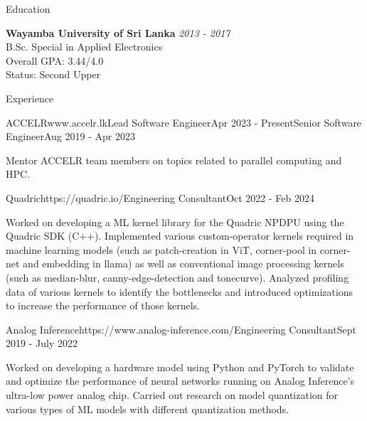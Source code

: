 \documentclass[
	11pt, %
]{./assets/resume} %
\begin{document}
\begin{rSection}{Education}

	\textbf{Wayamba University of Sri Lanka} \hfill \textit{2013 - 2017} \\ 
	B.Sc. Special in Applied Electronics \\
	Overall GPA: 3.44/4.0 \\
	Status: Second Upper
	
\end{rSection}


\begin{rSection}{Experience}

	\begin{rSubsectionM}{ACCELR}{www.accelr.lk}{Lead Software Engineer}{Apr 2023 - Present}{Senior Software Engineer}{Aug 2019 - Apr 2023}{}{}
        \item Mentor ACCELR team members on topics related to parallel computing and HPC.
	\end{rSubsectionM}

	\begin{rSubsectionX}{Quadric}{https://quadric.io/}{Engineering Consultant}{Oct 2022 - Feb 2024}
		\item Worked on developing a ML kernel library for the Quadric NPDPU using the Quadric SDK (C++). Implemented various custom-operator kernels required in machine learning models (such as patch-creation in ViT, corner-pool in corner-net and embedding in llama) as well as conventional image processing kernels (such as median-blur, canny-edge-detection and tonecurve). Analyzed profiling data of various kernels to identify the bottlenecks and introduced optimizations to increase the performance of those kernels.
	\end{rSubsectionX}

	\begin{rSubsectionX}{Analog Inference}{https://www.analog-inference.com/}{Engineering Consultant}{Sept 2019 - July 2022}
		\item Worked on developing a hardware model using Python and PyTorch to validate and optimize the performance of neural networks running on Analog Inference’s ultra-low power analog chip. Carried out research on model quantization for various types of ML models with different quantization methods.
	\end{rSubsectionX}


\end{rSection}
\end{document}
